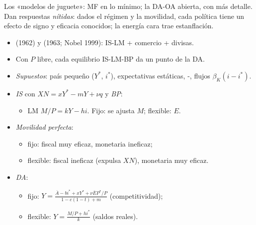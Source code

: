 \documentclass{article}
\begin{document}
\begin{columnas}
\begin{ideaclave}
Los «modelos de juguete»: MF en lo mínimo; la DA-OA abierta, con más detalle. Dan respuestas \emph{nítidas}: dados el régimen y la movilidad, cada política tiene un efecto de signo y eficacia conocidos; la energía cara trae estanflación.
\end{ideaclave}
\begin{itemize}
\item {} (1962) y  (1963; Nobel 1999): IS-LM + comercio + divisas.
\item Con $P$ libre, cada equilibrio IS-LM-BP da un punto de la DA.
\end{itemize}
\begin{itemize}
\item \emph{Supuestos}: país pequeño ($Y^*$, $i^*$), expectativas estáticas, -, flujos $\beta_K(i-i^*)$.
\item \emph{IS} con $XN=xY^*-mY+\nu q$ y \emph{BP}:
  \begin{itemize}
  \item LM $M/P=kY-hi$. Fijo: se ajusta $M$; flexible: $E$.
  \end{itemize}
\item \emph{Movilidad perfecta}:
  \begin{itemize}
  \item fijo: fiscal muy eficaz, monetaria ineficaz;
  \item flexible: fiscal ineficaz (expulsa $XN$), monetaria muy eficaz.
  \end{itemize}
\end{itemize}
\begin{itemize}
\item \emph{DA}:
  \begin{itemize}
  \item fijo: $Y=\frac{\overline{A}-bi^*+xY^*+\nu\overline{E}P^*/P}{1-c(1-t)+m}$ (competitividad);
  \item flexible: $Y=\frac{M/P+hi^*}{k}$ (saldos reales).

\end{itemize}
\end{itemize}
\end{columnas}
\end{document}
